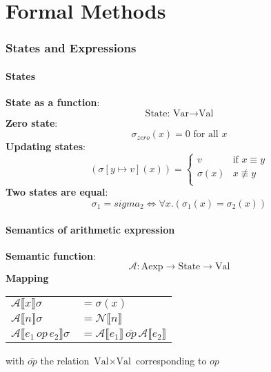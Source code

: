 \documentclass[12pt]{article}
\def\li{\rightarrow}
\def\fax{\forall x.}
\def\A{\mathcal{A}}
\def\llb{\llbracket}
\def\rrb{\rrbracket}
\begin{document}
\part*{Formal Methods}
\setcounter{section}{0}
\renewcommand*{\theHsection}{chY.\the\value{section}}

\section{States and Expressions}
\subsection{States}
\textbf{State as a function}: 
$$\text{State: Var} \li \text{Val}$$ 
\textbf{Zero state}: 
$$\sigma_{zero}(x)=0\text{ for all }x$$
\textbf{Updating states}: 
$$ (\sigma[y\mapsto v](x)) = \begin{cases}
v & \text{if } x \equiv y \\
\sigma(x) & x \not\equiv y \\
\end{cases}
$$
\textbf{Two states are equal}:
$$ \sigma_1 = sigma_2 \Leftrightarrow \fax (\sigma_1(x) = \sigma_2(x))$$

\subsection{Semantics of arithmetic expression}
\textbf{Semantic function}:
$$ \A: \text{Aexp}\li \text{State} \li \text{Val}$$
\textbf{Mapping} \\
\begin{center}
\begin{tabular}{l l}
    $\A \llb x\rrb \sigma$ & $= \sigma(x)$ \\
    $\A \llb n\rrb \sigma$ & $= \mathcal{N}\llb n\rrb$ \\
    $\A \llb e_1 \, op \, e_2\rrb \sigma$ & $= \A\llb e_1\rrb \, \overline{op} \, \A\llb e_2\rrb$ 
\end{tabular}
\end{center}
with $\overline{op}$ the relation $\text{Val}\times\text{Val}$ corresponding to $op$
\end{document}
